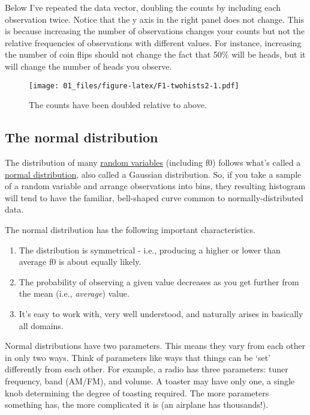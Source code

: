 \documentclass[
]{book}
\begin{document}
Below I've repeated the data vector, doubling the counts by including each observation twice. Notice that the y axis in the right panel does not change. This is because increasing the number of observations changes your counts but not the relative frequencies of observations with different values. For instance, increasing the number of coin flips should not change the fact that 50\% will be heads, but it will change the number of heads you observe.

\begin{figure}
\centering
\texttt{[image: 01\_files/figure-latex/F1-twohists2-1.pdf]}
\caption{\label{fig:F1-twohists2}The counts have been doubled relative to above.}
\end{figure}

\hypertarget{the-normal-distribution}{%
\subsection{The normal distribution}\label{the-normal-distribution}}

The distribution of many \href{https://www.youtube.com/watch?v=4HpvBZnHOVI}{random variables} (including f0) follows what's called a \href{https://en.wikipedia.org/wiki/Normal_distribution}{normal distribution}, also called a Gaussian distribution. So, if you take a sample of a random variable and arrange observations into bins, they resulting histogram will tend to have the familiar, bell-shaped curve common to normally-distributed data.

The normal distribution has the following important characteristics.

\begin{enumerate}
\def\labelenumi{\arabic{enumi}.}
\item
  The distribution is symmetrical - i.e., producing a higher or lower than average f0 is about equally likely.
\item
  The probability of observing a given value decreases as you get further from the mean (i.e., \emph{average}) value.
\item
  It's easy to work with, very well understood, and naturally arises in basically all domains.
\end{enumerate}

Normal distributions have two parameters. This means they vary from each other in only two ways. Think of parameters like ways that things can be `set' differently from each other. For example, a radio has three parameters: tuner frequency, band (AM/FM), and volume. A toaster may have only one, a single knob determining the degree of toasting required. The more parameters something has, the more complicated it is (an airplane has thousands!).
\end{document}
